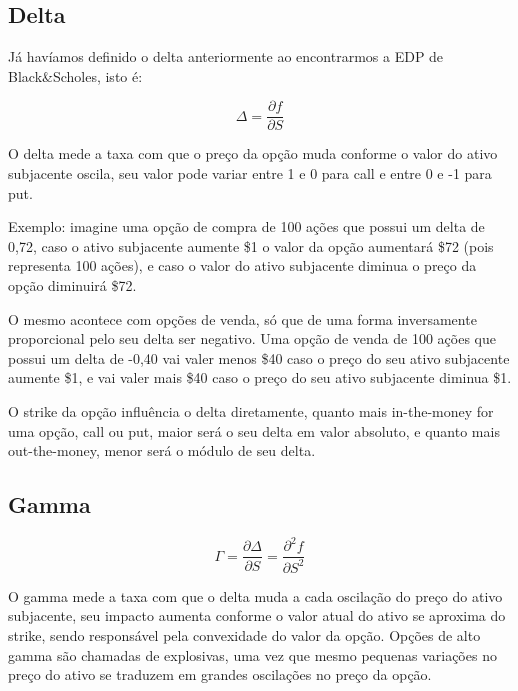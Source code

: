 \documentclass[]{book}
\theoremstyle{definition}
\theoremstyle{definition}
\theoremstyle{definition}
\theoremstyle{remark}
\begin{document}
\hypertarget{delta}{%
\subsection{Delta}\label{delta}}

Já havíamos definido o delta anteriormente ao encontrarmos a EDP de Black\&Scholes, isto é:

\begin{equation}
\Delta = \frac{\partial f}{\partial S}
\label{eq:delta}
\end{equation}

O delta mede a taxa com que o preço da opção muda conforme o valor do ativo subjacente oscila, seu valor pode variar entre 1 e 0 para call e entre 0 e -1 para put.

Exemplo: imagine uma opção de compra de 100 ações que possui um delta de 0,72, caso o ativo subjacente aumente {\$}1 o valor da opção aumentará {\$}72 (pois representa 100 ações), e caso o valor do ativo subjacente diminua o preço da opção diminuirá {\$}72.

O mesmo acontece com opções de venda, só que de uma forma inversamente proporcional pelo seu delta ser negativo. Uma opção de venda de 100 ações que possui um delta de -0,40 vai valer menos {\$}40 caso o preço do seu ativo subjacente aumente {\$}1, e vai valer mais {\$}40 caso o preço do seu ativo subjacente diminua {\$}1.

O strike da opção influência o delta diretamente, quanto mais in-the-money for uma opção, call ou put, maior será o seu delta em valor absoluto, e quanto mais out-the-money, menor será o módulo de seu delta.

\hypertarget{gamma}{%
\subsection{Gamma}\label{gamma}}

\begin{equation}
\Gamma = \frac{\partial \Delta}{\partial S} = \frac{\partial^2 f}{\partial S^2}
\label{eq:gamma}
\end{equation}

O gamma mede a taxa com que o delta muda a cada oscilação do preço do ativo subjacente, seu impacto aumenta conforme o valor atual do ativo se aproxima do strike, sendo responsável pela convexidade do valor da opção. Opções de alto gamma são chamadas de explosivas, uma vez que mesmo pequenas variações no preço do ativo se traduzem em grandes oscilações no preço da opção.
\end{document}
